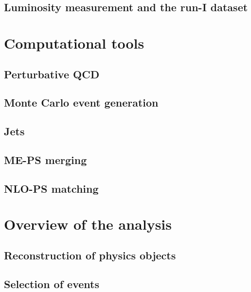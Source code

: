 \documentclass[hyper,linkcolor=blue]{mythesis}
\begin{document}
\begin{mainmatter}
    \section{Luminosity measurement and the run-I dataset}
      \label{sec:dataset}
      

  \chapter{Computational tools}
    \label{chap:tools}
    
    \section{Perturbative QCD}
      \label{sec:qcd}
      
    \section{Monte Carlo event generation}
      \label{sec:mc}
      
    \section{Jets}
      \label{sec:jets}
      
    \section{ME-PS merging}
      \label{sec:merging}
      
    \section{NLO-PS matching}
      \label{sec:matching}
      
  
  \chapter{Overview of the \HWW analysis}
    \label{chap:selection}
    
    \section{Reconstruction of physics objects}
      \label{sec:objects}
      
    \section{Selection of \WW events}
      \label{sec:presel}
      

\end{mainmatter}
\end{document}
